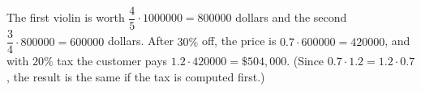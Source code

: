 The first violin is worth $\dfrac45\cdot1000000=800000$ dollars and the second $\dfrac34\cdot800000=600000$ dollars. After $30\%$ off, the price is $0.7\cdot600000=420000$, and with $20\%$ tax the customer pays $1.2\cdot420000=\boxed{\$504{,}000}$. (Since $0.7\cdot1.2=1.2\cdot0.7$, the result is the same if the tax is computed first.)
